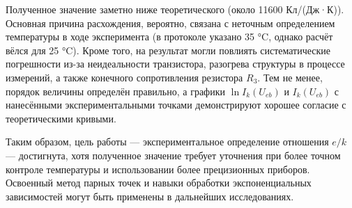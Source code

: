 Полученное значение заметно ниже теоретического (около 11600 Кл/(Дж·К)). Основная причина расхождения, вероятно, связана с неточным определением температуры в ходе эксперимента (в протоколе указано 35 °C, однако расчёт вёлся для 25 °C). Кроме того, на результат могли повлиять систематические погрешности из-за неидеальности транзистора, разогрева структуры в процессе измерений, а также конечного сопротивления резистора \(R_3\). Тем не менее, порядок величины определён правильно, а графики \(\ln I_k(U_{eb})\) и \(I_k(U_{eb})\) с нанесёнными экспериментальными точками демонстрируют хорошее согласие с теоретическими кривыми.

Таким образом, цель работы — экспериментальное определение отношения \(e/k\) — достигнута, хотя полученное значение требует уточнения при более точном контроле температуры и использовании более прецизионных приборов. Освоенный метод парных точек и навыки обработки экспоненциальных зависимостей могут быть применены в дальнейших исследованиях.
